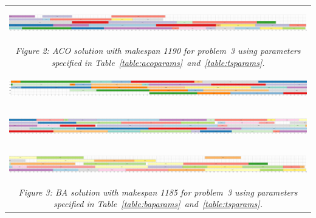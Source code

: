 \documentclass[paper=a4, fontsize=9pt]{scrartcl}
\begin{document}
\begin{landscape}
{\begin{table}
\begin{tabular}{l}
\hspace{0.90909pt}\includegraphics[height=40pt]{figures/solution_aco_instance_3_3_scaled}\\
\multicolumn{1}{c}{\textit{Figure 2: \acf{ACO} solution with makespan 1190 for problem~3 using parameters specified in Table~\ref{table:acoparams}~and~\ref{table:tsparams}.}}\\[1.2cm]
\includegraphics[height=40pt]{figures/solution_ba_instance_3_1_scaled}\\[0.15cm]
\hspace{0.90909pt}\includegraphics[height=40pt]{figures/solution_ba_instance_3_2_scaled}\\[0.15cm]
\hspace{0.90909pt}\includegraphics[height=40pt]{figures/solution_ba_instance_3_3_scaled}\\
\multicolumn{1}{c}{\textit{Figure 3: \acf{BA} solution with makespan 1185 for problem~3 using parameters specified in Table~\ref{table:baparams}~and~\ref{table:tsparams}.}}\\
\end{tabular}
\end{table}
}
\end{landscape}
\end{document}
